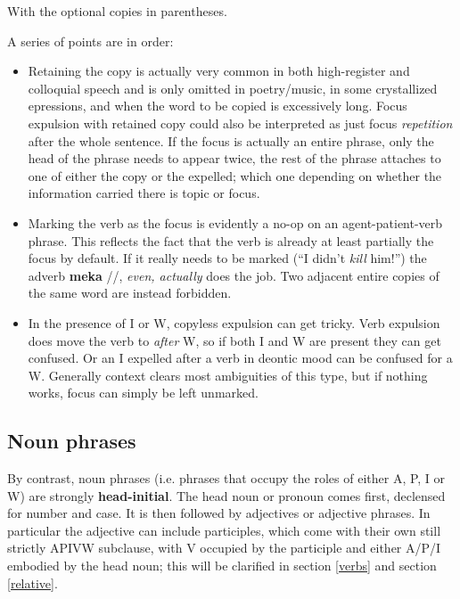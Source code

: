 \documentclass[10pt,oneside]{memoir}
\newcommand{\ipa}[1]{/\textipa{#1}/}
\begin{document}
\begin{multicols}{2}
With the optional copies in parentheses.

A series of points are in order:

\begin{itemize}
    \item Retaining the copy is actually very common in both high-register and colloquial speech and is only omitted in poetry/music, in some crystallized epressions, and when the word to be copied is excessively long. Focus expulsion with retained copy could also be interpreted as just focus \emph{repetition} after the whole sentence. If the focus is actually an entire phrase, only the head of the phrase needs to appear twice, the rest of the phrase attaches to one of either the copy or the expelled; which one depending on whether the information carried there is topic or focus.
    \item Marking the verb as the focus is evidently a no-op on an agent-patient-verb phrase. This reflects the fact that the verb is already at least partially the focus by default. If it really needs to be marked (``I didn't \emph{kill} him!'') the adverb \textbf{meka} \ipa{"mEka}, \emph{even, actually} does the job. Two adjacent entire copies of the same word are instead forbidden.
    \item In the presence of I or W, copyless expulsion can get tricky. Verb expulsion does move the verb to \emph{after} W, so if both I and W are present they can get confused. Or an I expelled after a verb in deontic mood can be confused for a W. Generally context clears most ambiguities of this type, but if nothing works, focus can simply be left unmarked.
\end{itemize}



\subsection{Noun phrases}

By contrast, noun phrases (i.e. phrases that occupy the roles of either A, P, I or W) are strongly \textbf{head-initial}. The head noun or pronoun comes first, declensed for number and case. It is then followed by adjectives or adjective phrases. In particular the adjective can include participles, which come with their own still strictly APIVW subclause, with V occupied by the participle and either A/P/I embodied by the head noun; this will be clarified in section \ref{verbs} and section \ref{relative}.


\end{multicols}
\end{document}

